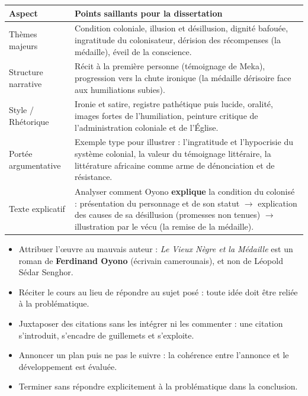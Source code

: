 \documentclass[11pt]{article}
\newcommand{\cle}[1]{{\popxbold\color{popdark}#1}}
\begin{document}
\begin{center}
\begin{tabularx}{\linewidth}{|l|X|}\hline
\rowcolor{popblueL} \textbf{Aspect} & \textbf{Points saillants pour la dissertation} \\ \hline
\cle{Thèmes majeurs} & Condition coloniale, illusion et désillusion, dignité bafouée, ingratitude du colonisateur, dérision des récompenses (la médaille), éveil de la conscience. \\ \hline
\cle{Structure narrative} & Récit à la première personne (témoignage de Meka), progression vers la chute ironique (la médaille dérisoire face aux humiliations subies). \\ \hline
\cle{Style / Rhétorique} & Ironie et satire, registre pathétique puis lucide, oralité, images fortes de l'humiliation, peinture critique de l'administration coloniale et de l'Église. \\ \hline
\cle{Portée argumentative} & Exemple type pour illustrer : l'ingratitude et l'hypocrisie du système colonial, la valeur du témoignage littéraire, la littérature africaine comme arme de dénonciation et de résistance. \\ \hline
\cle{Texte explicatif} & Analyser comment Oyono \textbf{explique} la condition du colonisé : présentation du personnage et de son statut $\rightarrow$ explication des causes de sa désillusion (promesses non tenues) $\rightarrow$ illustration par le vécu (la remise de la médaille). \\ \hline
\end{tabularx}
\end{center}

\begin{attention}
\begin{itemize}
    \item Attribuer l'œuvre au mauvais auteur : \emph{Le Vieux Nègre et la Médaille} est un roman de \textbf{Ferdinand Oyono} (écrivain camerounais), et non de Léopold Sédar Senghor.
    \item Réciter le cours au lieu de répondre au sujet posé : toute idée doit être reliée à la problématique.
    \item Juxtaposer des citations sans les intégrer ni les commenter : une citation s'introduit, s'encadre de guillemets et s'exploite.
    \item Annoncer un plan puis ne pas le suivre : la cohérence entre l'annonce et le développement est évaluée.
    \item Terminer sans répondre explicitement à la problématique dans la conclusion.
\end{itemize}
\end{attention}
\end{document}
